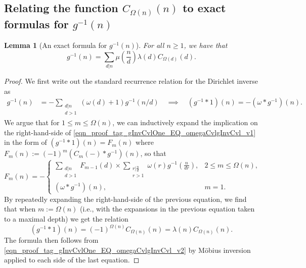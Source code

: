 \documentclass[11pt,reqno,a4letter]{article}
\numberwithin{figure}{section}
\numberwithin{table}{section}
\theoremstyle{plain}
\newtheorem{lemma}[theorem]{Lemma}
\numberwithin{theorem}{section}
\theoremstyle{definition}
\begin{document}
\subsection{Relating the function $C_{\Omega(n)}(n)$ to exact formulas for $g^{-1}(n)$} 
\label{subSection_Relating_CknFuncs_to_gInvn} 

\begin{lemma}[An exact formula for $g^{-1}(n)$] 
\label{lemma_AnExactFormulaFor_gInvByMobiusInv_v1} 
For all $n \geq 1$, we have that 
\[
g^{-1}(n) = \sum_{d|n} \mu\left(\frac{n}{d}\right) \lambda(d) C_{\Omega(d)}(d). 
\]
\end{lemma}
\begin{proof} 
We first write out the standard recurrence relation for the Dirichlet inverse as 
\begin{align} 
\label{eqn_proof_tag_gInvCvlOne_EQ_omegaCvlgInvCvl_v1} 
g^{-1}(n) & = - \sum_{\substack{d|n \\ d>1}} (\omega(d) + 1) g^{-1}(n/d) 
     \quad\implies\quad 
     (g^{-1} \ast 1)(n) = -(\omega \ast g^{-1})(n). 
\end{align} 
We argue that for $1 \leq m \leq \Omega(n)$, we can inductively expand the 
implication on the right-hand-side of \eqref{eqn_proof_tag_gInvCvlOne_EQ_omegaCvlgInvCvl_v1} 
in the form of $(g^{-1} \ast 1)(n) = F_m(n)$ where 
$F_m(n) := (-1)^{m} (C_m(-) \ast g^{-1})(n)$, so that 
\[
F_m(n) = - 
     \begin{cases} 
     \sum\limits_{\substack{d|n \\ d > 1}} F_{m-1}(d) \times \sum\limits_{\substack{r|\frac{n}{d} \\ r > 1}} 
     \omega(r) g^{-1}\left(\frac{n}{dr}\right), & 2 \leq m \leq \Omega(n), \\ 
     (\omega \ast g^{-1})(n), & m = 1. 
     \end{cases} 
\]
By repeatedly expanding the right-hand-side of the previous equation, 
we find that when $m := \Omega(n)$ (i.e., with the expansions 
in the previous equation taken to a maximal depth) we get the relation 
\begin{equation} 
\label{eqn_proof_tag_gInvCvlOne_EQ_omegaCvlgInvCvl_v2} 
(g^{-1} \ast 1)(n) = (-1)^{\Omega(n)} C_{\Omega(n)}(n) = \lambda(n) C_{\Omega(n)}(n). 
\end{equation} 
The formula then follows from \eqref{eqn_proof_tag_gInvCvlOne_EQ_omegaCvlgInvCvl_v2} 
by M\"obius inversion applied to each side of the last equation. 
\end{proof} 
\end{document}

